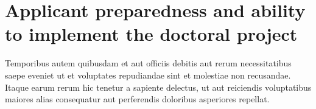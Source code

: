 \documentclass[12pt]{extarticle}
\begin{document}
\section{Applicant preparedness and ability to implement the doctoral project}
Temporibus autem quibusdam et aut officiis debitis aut rerum necessitatibus saepe eveniet ut et voluptates repudiandae sint et molestiae non recusandae. Itaque earum rerum hic tenetur a sapiente delectus, ut aut reiciendis voluptatibus maiores alias consequatur aut perferendis doloribus asperiores repellat.



\end{document}
